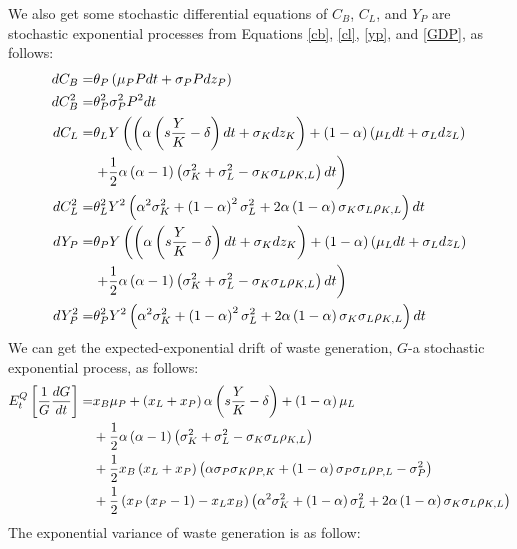 \documentclass[sn-basic]{sn-jnl}%
\theoremstyle{thmstyleone}%
\theoremstyle{thmstyletwo}%
\theoremstyle{thmstylethree}%
\begin{document}
\begin{appendices}
	We also get some stochastic differential equations of $C_B$, $C_L$, and $Y_P$ are stochastic exponential processes from Equations \ref{cb}, \ref{cl}, \ref{yp}, and \ref{GDP}, as follows:
	\begin{align}
		dC_B=& \theta_P \left(\mu_P P dt + \sigma_P P dz_P\right) \notag\\
		dC_B^2=& \theta_P^2 \sigma_P^2 P^2 dt\notag\\
		dC_L=& \theta_L Y \left(\left(\alpha \left(s\frac{Y}{K}-\delta\right)dt + \sigma_K dz_K\right)+\left(1-\alpha\right)\left(\mu_L dt+\sigma_L dz_L\right)\right.\notag\\  &\left. +\frac{1}{2}\alpha\left(\alpha-1\right)\left(\sigma_K^2+\sigma_L^2-\sigma_K\sigma_L\rho_{K,L}\right)dt\right) \notag\\
		dC_L^2=& \theta_L^2 Y^2\left(\alpha^2\sigma_K^2+\left(1-\alpha\right)^2\sigma_L^2+2\alpha\left(1-\alpha\right)\sigma_K\sigma_L\rho_{K,L}\right)dt \notag\\
		dY_P=& \theta_P Y \left(\left(\alpha \left(s\frac{Y}{K}-\delta\right)dt + \sigma_K dz_K\right)+\left(1-\alpha\right)\left(\mu_L dt+\sigma_L dz_L\right)\right.\notag\\ & \left.  +\frac{1}{2}\alpha\left(\alpha-1\right)\left(\sigma_K^2+\sigma_L^2-\sigma_K\sigma_L\rho_{K,L}\right)dt\right) \notag\\
		dY_P^2=& \theta_P^2 Y^2\left(\alpha^2\sigma_K^2+\left(1-\alpha\right)^2\sigma_L^2+2\alpha\left(1-\alpha\right)\sigma_K\sigma_L\rho_{K,L}\right)dt \notag
	\end{align}
	We can get the expected-exponential drift of waste generation, $G$-a stochastic exponential process, as follows:
	\begin{align}\label{wg_mean}
		E_t^Q\left[\frac{1}{G}\frac{dG}{dt}\right]=&x_B\mu_P +\left(x_L+x_P\right)\alpha\left(s\frac{Y}{K}-\delta\right)+\left(1-\alpha\right)\mu_L\notag\\
		&+\frac{1}{2}\alpha\left(\alpha-1\right)\left(\sigma_K^2+\sigma_L^2-\sigma_K\sigma_L\rho_{K,L}\right) \notag\\
		&+ \frac{1}{2}x_B\left(x_L+x_P\right)\left(\alpha\sigma_P\sigma_K\rho_{P,K}+\left(1-\alpha\right)\sigma_P\sigma_L\rho_{P,L}-\sigma_P^2\right)\notag\\
		&+\frac{1}{2}\left(x_P\left(x_P-1\right)-x_Lx_B\right)\left( \alpha^2\sigma_K^2+\left(1-\alpha\right)\sigma_L^2+2\alpha\left(1-\alpha\right)\sigma_K\sigma_L\rho_{K,L} \right)
	\end{align}
	The exponential variance of waste generation is as follow:

\end{appendices}
\end{document}
